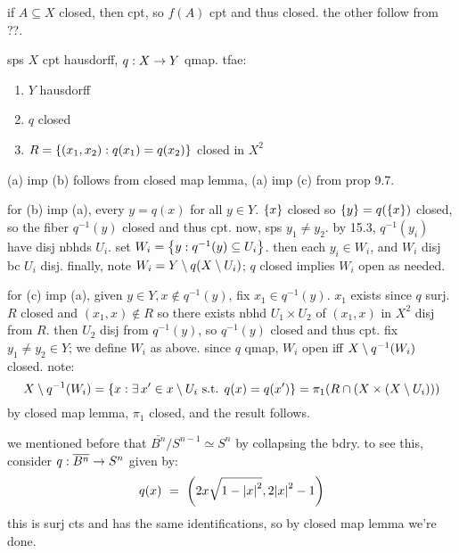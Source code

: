 \begin{pf}[source=Primary Source Material]
    if $A\subseteq X$ closed, then cpt, so $f(A)$ cpt and thus closed.
    the other follow from ??.
\end{pf}

\begin{prop}
    sps $X$ cpt hausdorff, $q:X\rightarrow Y$ qmap. tfae: \vspace{-0.2in}
    \begin{enumerate}[(\alph*),parsep=3pt]
        \item $Y$ hausdorff
        \item $q$ closed
        \item $R=\left\{{(x_{1},x_{2}):q(x_{1})=q(x_{2})}\right\}$ closed in $X^{2}$
    \end{enumerate}
\end{prop}

\begin{pf}[source=Primary Source Material]
    (a) imp (b) follows from closed map lemma, (a) imp (c) from prop 9.7.

    for (b) imp (a), every $y=q(x)$ for all $y\in Y$.
    $\left\{{x}\right\}$ closed so $\left\{{y}\right\}=q(\left\{{x}\right\})$ closed, so the fiber $q^{-1}(y)$
    closed and thus cpt. now, sps $y_{1}\neq y_{2}$.
    by 15.3, $q^{-1}(y_{i})$ have disj nbhds $U_{i}$.
    set $W_{i}=\left\{{y:q^{-1}(y)\subseteq U_{i}}\right\}$.
    then each $y_{i}\in W_{i}$, and $W_{i}$ disj bc $U_{i}$ disj.
    finally, note $W_{i}=Y\setminus q(X\setminus U_{i})$;
    $q$ closed implies $W_{i}$ open as needed.

    for (c) imp (a), given $y\in Y,x \notin q^{-1}(y)$, fix $x_{1}\in q^{-1}(y)$.
    $x_{1}$ exists since $q$ surj.
    $R$ closed and $(x_{1},x) \notin R$ so there exists nbhd $U_{1}\times U_{2}$
    of $(x_{1},x)$ in $X^{2}$ disj from $R$.
    then $U_{2}$ disj from $q^{-1}(y)$, so $q^{-1}(y)$ closed and thus cpt.
    fix $y_{1}\neq y_{2}\in Y$; we define $W_{i}$ as above.
    since $q$ qmap, $W_{i}$ open iff $X\setminus q^{-1}(W_{i})$ closed. note:
    \begin{equation*}
        X\setminus q^{-1}(W_{i}) =
        \left\{{x:\exists \, x'\in x\setminus U_{i} \textrm{ s.t. } q(x)=q(x')}\right\}
        = \pi_{1}(R\cap(X\times(X\setminus U_{i})))
    \end{equation*}
    by closed map lemma, $\pi_{1}$ closed, and the result follows.
\end{pf}

\newpage
\begin{xmp}[source=Primary Source Material]
    we mentioned before that $\bar{B^{n}}/S^{n-1}\simeq S^{n}$ by collapsing
    the bdry.
    to see this, consider $q:\overline{B^{n}}\rightarrow S^{n}$ given by:
    \begin{equation*}
        q(x) \ = \ \left(2x\sqrt{1-\abs{x}^{2}},2\abs{x}^{2}-1\right)
    \end{equation*}
    this is surj cts and has the same identifications,
    so by closed map lemma we're done.
\end{xmp}

